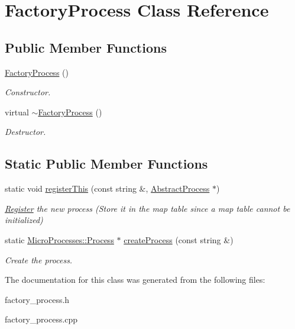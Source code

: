 \hypertarget{classFactoryProcess}{}\section{Factory\+Process Class Reference}
\label{classFactoryProcess}
\subsection*{Public Member Functions}
\begin{DoxyCompactItemize}
\item 
\mbox{\label{classFactoryProcess_a29186a501f70f12963785f4bcab4683a}} 
\mbox{\hyperlink{classFactoryProcess_a29186a501f70f12963785f4bcab4683a}{Factory\+Process}} ()
\begin{DoxyCompactList}\small\item\em Constructor. \end{DoxyCompactList}\item 
\mbox{\label{classFactoryProcess_a9e1252dfb61df685d0fb2ba9e79d4a21}} 
virtual \mbox{\hyperlink{classFactoryProcess_a9e1252dfb61df685d0fb2ba9e79d4a21}{$\sim$\+Factory\+Process}} ()
\begin{DoxyCompactList}\small\item\em Destructor. \end{DoxyCompactList}\end{DoxyCompactItemize}
\subsection*{Static Public Member Functions}
\begin{DoxyCompactItemize}
\item 
\mbox{\label{classFactoryProcess_a9621ffe953d445a0a2e4c6a3970c9b87}} 
static void \mbox{\hyperlink{classFactoryProcess_a9621ffe953d445a0a2e4c6a3970c9b87}{register\+This}} (const string \&, \mbox{\hyperlink{classAbstractProcess}{Abstract\+Process}} $\ast$)
\begin{DoxyCompactList}\small\item\em \mbox{\hyperlink{classRegister}{Register}} the new process (Store it in the map table since a map table cannot be initialized) \end{DoxyCompactList}\item 
\mbox{\label{classFactoryProcess_ae1d7d44a5e5ea56fdedf68f910f930ff}} 
static \mbox{\hyperlink{classMicroProcesses_1_1Process}{Micro\+Processes\+::\+Process}} $\ast$ \mbox{\hyperlink{classFactoryProcess_ae1d7d44a5e5ea56fdedf68f910f930ff}{create\+Process}} (const string \&)
\begin{DoxyCompactList}\small\item\em Create the process. \end{DoxyCompactList}\end{DoxyCompactItemize}


The documentation for this class was generated from the following files\+:\begin{DoxyCompactItemize}
\item 
factory\+\_\+process.\+h\item 
factory\+\_\+process.\+cpp\end{DoxyCompactItemize}
